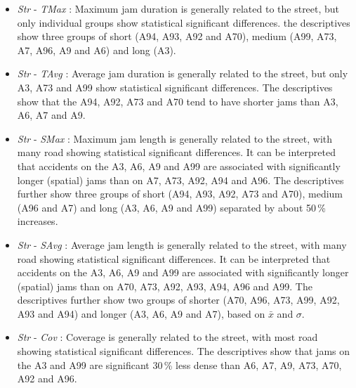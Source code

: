 \begin{itemize}
    \item \textit{Str} - \textit{TMax} : Maximum jam duration is generally related to the street, but only individual groups show statistical significant differences. the descriptives show three groups of short (A94, A93, A92 and A70), medium (A99, A73, A7, A96, A9 and A6) and long (A3).
    \data
    \item \textit{Str} - \textit{TAvg} : Average jam duration is generally related to the street, but only A3, A73 and A99 show statistical significant differences. The descriptives show that the A94, A92, A73 and A70 tend to have shorter jams than A3, A6, A7 and A9.
    \item \textit{Str} - \textit{SMax} : Maximum jam length is generally related to the street, with many road showing statistical significant differences. It can be interpreted that accidents on the A3, A6, A9 and A99 are associated with significantly longer (spatial) jams than on A7, A73, A92, A94 and A96. The descriptives further show three groups of short (A94, A93, A92, A73 and A70), medium (A96 and A7) and long (A3, A6, A9 and A99) separated by about 50\,\% increases.
    \item \textit{Str} - \textit{SAvg} : Average jam length is generally related to the street, with many road showing statistical significant differences. It can be interpreted that accidents on the A3, A6, A9 and A99 are associated with significantly longer (spatial) jams than on A70, A73, A92, A93, A94, A96 and A99. The descriptives further show two groups of shorter (A70, A96, A73, A99, A92, A93 and A94) and longer (A3, A6, A9 and A7), based on $\bar{x}$ and $\sigma$.
    \item \textit{Str} - \textit{Cov} : Coverage is generally related to the street, with most road showing statistical significant differences. The descriptives show that jams on the A3 and A99 are significant 30\,\% less dense than A6, A7, A9, A73, A70, A92 and A96.
\end{itemize}


